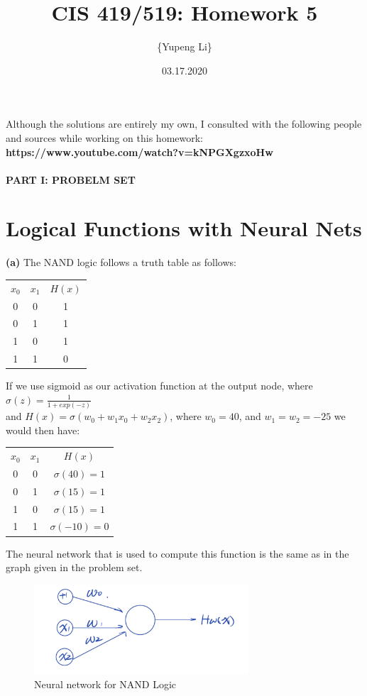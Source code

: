 \documentclass{article}
\title{CIS 419/519: Homework 5}
\author{\{Yupeng Li\}}
\date{03.17.2020}
\begin{document}
    \maketitle
    Although the solutions are entirely my own, I consulted with the following people and sources while working on this homework: \textbf{https://www.youtube.com/watch?v=kNPGXgzxoHw}
    \paragraph{PART I: PROBELM SET}
    \section{Logical Functions with Neural Nets}
    \textbf{(a)} 
    The NAND logic follows a truth table as follows:
    \begin{center}
\begin{tabular}{ c c c }
 $x_0$ & $x_1$ & $H(x)$ \\ 
 0 & 0 & 1 \\  
 0 & 1 & 1 \\  
 1 & 0 & 1 \\
 1 & 1& 0  \\
\end{tabular}
\end{center}

If we use sigmoid as our activation function at the output node, where $\sigma(z) = \frac{1}{1+exp(-z)}$
\\and $H(x) = \sigma(w_0 + w_1 x_0 + w_2 x_2)$, where $w_0 = 40$, and $w_1 = w_2 =  -25$ we would then have:

\begin{center}
\begin{tabular}{ c c c }
 $x_0$ & $x_1$ & $H(x)$\\ 
 0 & 0 & $\sigma(40) = 1$ \\  
 0 & 1 & $ \sigma(15) = 1$ \\  
 1 & 0 & $\sigma(15) = 1 $\\
 1 & 1 & $ \sigma(-10) = 0$
\end{tabular}
\end{center}
The neural network that is used to compute this function is the same as in the graph given in the problem set. 

		\begin{figure}[H]
			\caption{Neural network for NAND Logic}
			\centering
			\includegraphics[width=8cm]{HW5_1.jpeg}
		\end{figure}
\end{document}
